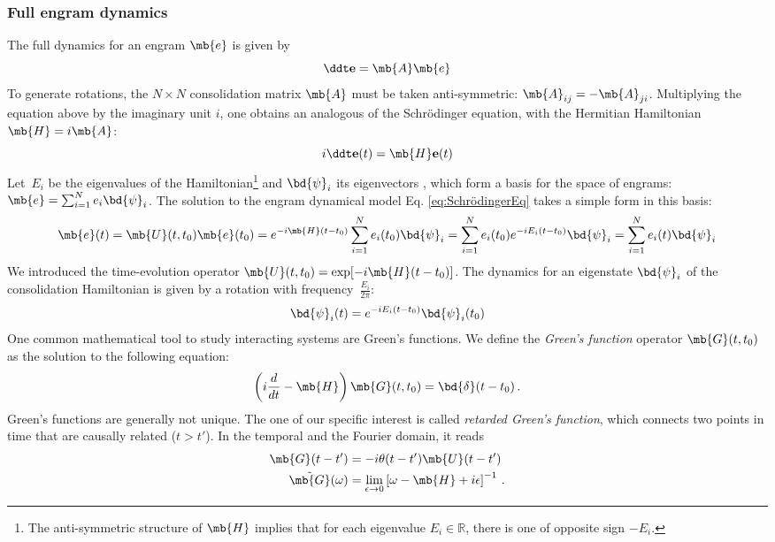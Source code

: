 \subsubsection*{Full engram dynamics}
The full dynamics for an engram $\mb{e}$ is given by
\begin{equation*}
    \ddt \mathbf{e} = \mb{A} \mb{e}
\end{equation*}
To generate rotations, the $N\times N$ consolidation matrix $\mb{A}$ must be taken anti-symmetric: $\mb{A}_{ij} = -\mb{A}_{ji}$.
Multiplying the equation above by the imaginary unit $i$, one obtains an analogous of the Schrödinger equation, with the Hermitian Hamiltonian $\mb{H} = i \mb{A}$:
\begin{equation}
    i \ddt \mathbf{e}(t) = \mb{H} \mathbf{e}
(t)
    \label{eq:SchrödingerEq}
\end{equation}
Let~$E_i$ be the eigenvalues of the Hamiltonian\footnote{The anti-symmetric structure of $\mb{H}$ implies that for each eigenvalue $E_i\in \mathbb{R}$, there is one of opposite sign $-E_i$.} and $\bd{\psi}_i$ its eigenvectors , which form a basis for the space of engrams:
$\mb{e} = \sum_{i=1}^N e_i \bd{\psi}_i$.
The solution to the engram dynamical model Eq. \ref{eq:SchrödingerEq} takes a simple form in this basis:
\begin{equation*}
    \mb{e}(t) =  \mb{U}(t, t_0) \mb{e}(t_0) = e^{-i \mb{H} (t-t_0)} \sum_{i=1}^N e_i(t_0) \bd{\psi}_i =
    \sum_{i=1}^N e_i(t_0) e^{-i E_i (t-t_0)} \bd{\psi}_i =
    \sum_{i=1}^N e_i(t) \bd{\psi}_i
\end{equation*}
We introduced the time-evolution operator $\mb{U}(t, t_0) = \exp[-i \mb{H} (t-t_0)]$.
The dynamics for an eigenstate $\bd{\psi}_i$ of the consolidation Hamiltonian is given by a rotation with frequency~$\frac{E_i}{2\pi}$:
$$\bd{\psi}_i(t) = e^{-i E_i (t-t_0)} \bd{\psi}_i(t_0)$$
One common mathematical tool to study interacting systems are Green's functions. We define the \textit{Green's function} operator $\mb{G}(t, t_0)$ as the solution to the following equation:
\begin{equation}
\left(i\frac{d}{dt} - \mb{H}\right)\mb{G}(t, t_0) =  \bd{\delta}(t-t_0) \,.
\label{eq:greensfunctiondefinition}
\end{equation}
Green's functions are generally not unique. The one of our specific interest is called \textit{retarded Green's function}, which connects two points in time that are causally related ($t>t'$). In the temporal and the Fourier domain, it reads
\begin{align}
    \mb{G}(t-t') &= -i \theta(t-t') \mb{U}(t-t')\\
    \Tilde{\mb{G}}(\omega) &=
    \lim_{\epsilon\to 0}\left[\omega - \mb{H} + i\epsilon\right]^{-1} \,.
\end{align}
